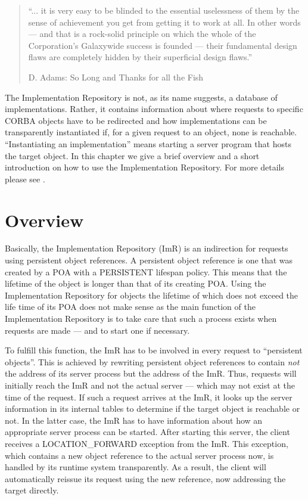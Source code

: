 
\begin{quote}
``...  it is  very easy to be blinded to  the essential uselessness of
them by  the sense of achievement you  get from getting it  to work at
all.  In other  words --- and that is a  rock-solid principle on which
the whole of the Corporation's Galaxywide success is founded --- their
fundamental design  flaws are  completely hidden by  their superficial
design flaws.''

             D. Adams: So Long and Thanks for all the Fish
\end{quote}

The Implementation Repository is not, as its name suggests, a database
of  implementations.   Rather,  it  contains information  about  where
requests  to specific  CORBA objects  have  to be  redirected and  how
implementations  can be  transparently  instantiated if,  for a  given
request  to   an  object,  none  is   reachable.   ``Instantiating  an
implementation'' means starting a server program that hosts the target
object.  In  this  chapter  we  give  a brief  overview  and  a  short
introduction  on how to  use the  Implementation Repository.  For more
details please see \cite{Henning1999}.

\section{Overview}

Basically, the  Implementation Repository (ImR) is  an indirection for
requests  using  persistent  object  references. A  persistent  object
reference is one that was created  by a POA with a PERSISTENT lifespan
policy. This means that the lifetime of the object is longer than that
of its creating POA.   Using the Implementation Repository for objects
the lifetime  of which does not exceed  the life time of  its POA does
not make sense  as the main function of  the Implementation Repository
is to take care that such  a process exists when requests are made ---
and to start one if necessary.

To fulfill this function, the ImR  has to be involved in every request
to ``persistent  objects''.  This is achieved  by rewriting persistent
object  references to  contain {\em  not}  the address  of its  server
process but  the address  of the ImR.   Thus, requests  will initially
reach the ImR and not the actual server --- which may not exist at the
time of the request. If such a request arrives at the ImR, it looks up
the  server information  in its  internal tables  to determine  if the
target object is reachable or not.  In the latter case, the ImR has to
have  information  about how  an  appropriate  server  process can  be
started.   After   starting  this   server,  the  client   receives  a
LOCATION\_FORWARD  exception  from  the  ImR.  This  exception,  which
contains a new  object reference to the actual  server process now, is
handled by its runtime system  transparently.  As a result, the client
will automatically  reissue its request  using the new  reference, now
addressing the target directly.

